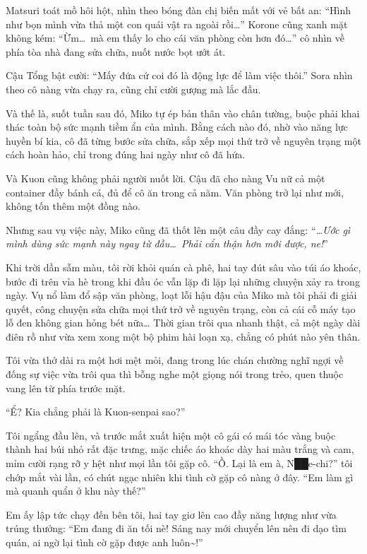 \documentclass[../main.tex]{subfiles}
\begin{document}
Matsuri toát mồ hôi hột, nhìn theo bóng đàn chị biến mất với vẻ bất an: ``Hình như bọn mình vừa thả một con quái vật ra ngoài rồi\dots'' Korone cũng xanh mặt không kém: ``Ừm\dots\ mà em thấy lo cho cái văn phòng còn hơn đó\dots'' cô nhìn về phía tòa nhà đang sửa chữa, nuốt nước bọt ướt át.

Cậu Tổng bật cười: ``Mấy đứa cứ coi đó là động lực để làm việc thôi.'' Sora nhìn theo cô nàng vừa chạy ra, cũng chỉ cười gượng mà lắc đầu.

Và thế là, suốt tuần sau đó, Miko tự ép bản thân vào chân tường, buộc phải khai thác toàn bộ sức mạnh tiềm ẩn của mình. Bằng cách nào đó, nhờ vào năng lực huyền bí kia, cô đã từng bước sửa chữa, sắp xếp mọi thứ trở về nguyên trạng một cách hoàn hảo, chỉ trong đúng hai ngày như cô đã hứa.

Và Kuon cũng không phải người nuốt lời. Cậu đã cho nàng Vu nữ cả một container đầy bánh cá, đủ để cô ăn trong cả năm. Văn phòng trở lại như mới, không tốn thêm một đồng nào.

Nhưng sau vụ việc này, Miko cũng đã thốt lên một câu đầy cay đắng: ``\textit{\dots Ước gì mình dùng sức mạnh này ngay từ đầu\dots\ Phải cẩn thận hơn mới được, ne!}''

\il


Khi trời dần sẫm màu, tôi rời khỏi quán cà phê, hai tay đút sâu vào túi áo khoác, bước đi trên vỉa hè trong khi đầu óc vẫn lặp đi lặp lại những chuyện xảy ra trong ngày. Vụ nổ làm đổ sập văn phòng, loạt lỗi hậu đậu của Miko mà tôi phải đi giải quyết, công chuyện sửa chữa mọi thứ trở về nguyên trạng, còn cả cái cỗ máy tạo lỗ đen không gian hỏng bét nữa… Thời gian trôi qua nhanh thật, cả một ngày dài điên rồ như vừa xem xong một bộ phim hài loạn xạ, chẳng có phút nào yên thân.

Tôi vừa thở dài ra một hơi mệt mỏi, đang trong lúc chán chường nghĩ ngợi về đống sự việc vừa trôi qua thì bỗng nghe một giọng nói trong trẻo, quen thuộc vang lên từ phía trước mặt.

``Ể? Kia chẳng phải là Kuon-senpai sao?''

Tôi ngẩng đầu lên, và trước mắt xuất hiện một cô gái có mái tóc vàng buộc thành hai búi nhỏ rất đặc trưng, mặc chiếc áo khoác dày hai màu trắng và cam, mỉm cười rạng rỡ y hệt như mọi lần tôi gặp cô. ``Ồ. Lại là em à, N██e-chi?'' tôi chớp mắt vài lần, có chút ngạc nhiên khi tình cờ gặp cô nàng ở đây. ``Em làm gì mà quanh quẩn ở khu này thế?''

Em ấy lập tức chạy đến bên tôi, hai tay giơ lên cao đầy năng lượng như vừa trúng thưởng: ``Em đang đi ăn tối nè! Sáng nay mới chuyển lên nên đi dạo tìm quán, ai ngờ lại tình cờ gặp được anh luôn\~{}!''
\end{document}
